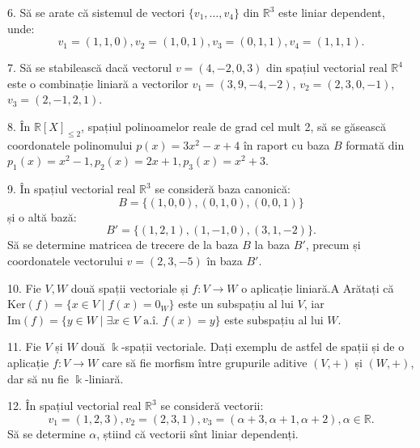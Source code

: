 \documentclass[11pt,a4paper]{article}
\newcommand\ai{\text{ a.\^{i}. }}
\newcommand\RR{\mathbb{R}}
\newcommand\Ker{\mathrm{Ker}}
\newcommand\Img{\mathrm{Im}}
\theoremstyle{dotless}
\theoremstyle{dotlessdr}
\begin{document}
\vspace{1cm}

6. Să se arate că sistemul de vectori $\{ v_1, \dots, v_4 \}$ din $\RR^3$ este
liniar dependent, unde:
\[
  v_1 = (1, 1, 0), v_2 = (1, 0, 1), v_3 = (0, 1, 1), v_4 = (1, 1, 1).
\]

\vspace{1cm}

7. Să se stabilească dacă vectorul $v = (4, -2, 0, 3)$ din spațiul vectorial
real $\RR^4$ este o combinație liniară a vectorilor $v_1 = (3, 9, -4, -2)$,
$v_2 = (2, 3, 0, -1)$, $v_3 = (2, -1, 2, 1)$.

\vspace{1cm}

8. În $\RR[X]_{\leq 2}$, spațiul polinoamelor reale de grad cel mult 2,
să se găsească coordonatele polinomului $p(x) = 3x^2 - x + 4$ în raport
cu baza $B$ formată din $p_1(x) = x^2 - 1, p_2(x) = 2x + 1, p_3(x) = x^2 + 3$.

\vspace{1cm}

9. În spațiul vectorial real $\RR^3$ se consideră baza canonică:
\[
  B = \{ (1, 0, 0), (0, 1, 0), (0, 0, 1) \}
\]
și o altă bază:
\[
  B' = \{(1, 2, 1), (1, -1, 0), (3, 1, -2) \}.
\]
Să se determine matricea de trecere de la baza $B$ la baza $B'$, precum și
coordonatele vectorului $v = (2, 3, -5)$ în baza $B'$.

\vspace{1cm}

10. Fie $V, W$ două spații vectoriale și $f : V \to W$ o aplicație liniară.A
Arătați că $\Ker(f) = \{x \in V \mid f(x) = 0_W\}$ este un subspațiu al lui
$V$, iar $\Img(f) = \{ y \in W \mid \exists x \in V \ai f(x) = y \}$ este
subspațiu al lui $W$.

\vspace{1cm}

11. Fie $V$ și $W$ două $\Bbbk$-spații vectoriale. Dați exemplu de astfel de
spații și de o aplicație $f : V \to W$ care să fie morfism între grupurile
aditive $(V, +)$ și $(W, +)$, dar să nu fie $\Bbbk$-liniară.

\vspace{1cm}

12. În spațiul vectorial real $\RR^3$ se consideră vectorii:
\[
  v_1 = (1, 2, 3), v_2 = (2, 3, 1), v_3 = (\alpha + 3, \alpha + 1, \alpha + 2), %
  \alpha \in \RR.
\]
Să se determine $\alpha$, știind că vectorii sînt liniar dependenți.

\vspace{1cm}
\end{document}
